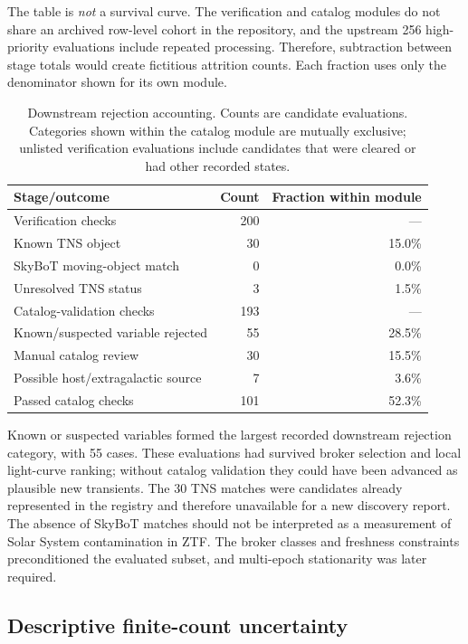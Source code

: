 \documentclass[11pt]{article}
\begin{document}
The table is \emph{not} a survival curve. The verification and catalog modules do not share an archived row-level cohort in the repository, and the upstream 256 high-priority evaluations include repeated processing. Therefore, subtraction between stage totals would create fictitious attrition counts. Each fraction uses only the denominator shown for its own module.

\begin{table}[ht]
\centering
\caption{Downstream rejection accounting. Counts are candidate evaluations. Categories shown within the catalog module are mutually exclusive; unlisted verification evaluations include candidates that were cleared or had other recorded states.}
\label{tab:funnel}
\begin{tabular}{lrr}
\toprule
Stage/outcome & Count & Fraction within module \\
\midrule
Verification checks & 200 & --- \\
\quad Known TNS object & 30 & 15.0\% \\
\quad SkyBoT moving-object match & 0 & 0.0\% \\
\quad Unresolved TNS status & 3 & 1.5\% \\
\midrule
Catalog-validation checks & 193 & --- \\
\quad Known/suspected variable rejected & 55 & 28.5\% \\
\quad Manual catalog review & 30 & 15.5\% \\
\quad Possible host/extragalactic source & 7 & 3.6\% \\
\quad Passed catalog checks & 101 & 52.3\% \\
\bottomrule
\end{tabular}
\end{table}

Known or suspected variables formed the largest recorded downstream rejection category, with 55 cases. These evaluations had survived broker selection and local light-curve ranking; without catalog validation they could have been advanced as plausible new transients. The 30 TNS matches were candidates already represented in the registry and therefore unavailable for a new discovery report. The absence of SkyBoT matches should not be interpreted as a measurement of Solar System contamination in ZTF. The broker classes and freshness constraints preconditioned the evaluated subset, and multi-epoch stationarity was later required.

\subsection{Descriptive finite-count uncertainty}
\end{document}
